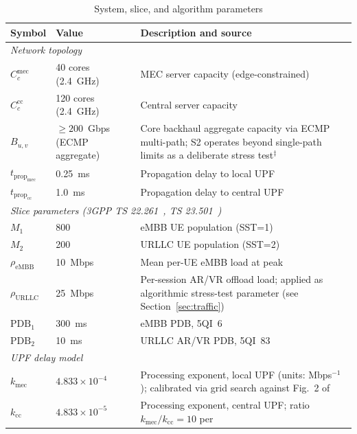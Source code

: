 \documentclass[conference]{IEEEtran}
\begin{document}
\begin{table}[ht]
\centering
\caption{System, slice, and algorithm parameters}
\label{tab:params}
\renewcommand{\arraystretch}{1.15}
\begin{tabular}{p{1.8cm}p{2.2cm}p{3.6cm}}
\toprule
\textbf{Symbol} & \textbf{Value} &
\textbf{Description and source} \\
\midrule
\multicolumn{3}{l}{\textit{Network topology}} \\
$C_c^\text{mec}$ & 40 cores (2.4~GHz) &
  MEC server capacity (edge-constrained) \\
$C_c^\text{cc}$ & 120 cores (2.4~GHz) &
  Central server capacity \\
$B_{u,v}$ & $\geq\!200$~Gbps (ECMP aggregate) &
  Core backhaul aggregate capacity via ECMP multi-path;
  S2 operates beyond single-path limits as a deliberate
  stress test$^\ddagger$ \\
$t_{\text{prop}_\text{mec}}$ & 0.25~ms &
  Propagation delay to local UPF \\
$t_{\text{prop}_\text{cc}}$ & 1.0~ms &
  Propagation delay to central UPF \\
\midrule
\multicolumn{3}{l}{\textit{Slice parameters
  (3GPP TS 22.261~\cite{3gpp_ts22261},
   TS 23.501~\cite{3gpp_ts23501})}} \\
$M_1$ & 800 &
  eMBB UE population (SST=1) \\
$M_2$ & 200 &
  URLLC UE population (SST=2) \\
$\rho_\text{eMBB}$ & 10~Mbps &
  Mean per-UE eMBB load at
  peak~\cite{superbowl_lvii,ericsson_f1_2023} \\
$\rho_\text{URLLC}$ & 25~Mbps &
  Per-session AR/VR offload load;
  applied as algorithmic stress-test parameter
  (see Section~\ref{sec:traffic})~\cite{yaqoob2020survey_360video} \\
$\text{PDB}_1$ & 300~ms &
  eMBB PDB, 5QI~6~\cite{3gpp_ts23501} \\
$\text{PDB}_2$ & 10~ms &
  URLLC AR/VR PDB,
  5QI~83~\cite{3gpp_ts22261} \\
\midrule
\multicolumn{3}{l}{\textit{UPF delay
  model~\cite{Alevizaki2021upf}}} \\
$k_\text{mec}$ & $4.833\!\times\!10^{-4}$ &
  Processing exponent, local UPF
  (units: Mbps$^{-1}$); calibrated via
  grid search against Fig.~2
  of~\cite{Alevizaki2021upf} \\
$k_\text{cc}$ & $4.833\!\times\!10^{-5}$ &
  Processing exponent, central UPF;
  ratio $k_\text{mec}/k_\text{cc}=10$
  per~\cite{Alevizaki2021upf} \\

\end{tabular}
\end{table}
\end{document}
